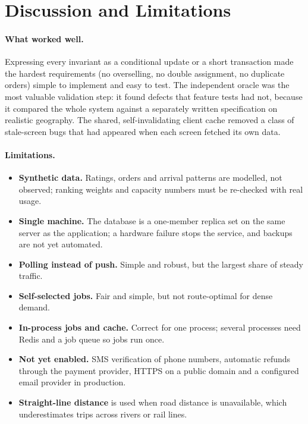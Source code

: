 \documentclass[manuscript,screen,review]{acmart}
\begin{document}
\section{Discussion and Limitations}
\label{sec:discussion}

\paragraph{What worked well.} Expressing every invariant as a conditional update or a short transaction made the hardest requirements (no overselling, no double assignment, no duplicate orders) simple to implement and easy to test. The independent oracle was the most valuable validation step: it found defects that feature tests had not, because it compared the whole system against a separately written specification on realistic geography. The shared, self-invalidating client cache removed a class of stale-screen bugs that had appeared when each screen fetched its own data.

\paragraph{Limitations.}
\begin{itemize}
  \item \textbf{Synthetic data.} Ratings, orders and arrival patterns are modelled, not observed; ranking weights and capacity numbers must be re-checked with real usage.
  \item \textbf{Single machine.} The database is a one-member replica set on the same server as the application; a hardware failure stops the service, and backups are not yet automated.
  \item \textbf{Polling instead of push.} Simple and robust, but the largest share of steady traffic.
  \item \textbf{Self-selected jobs.} Fair and simple, but not route-optimal for dense demand.
  \item \textbf{In-process jobs and cache.} Correct for one process; several processes need Redis and a job queue so jobs run once.
  \item \textbf{Not yet enabled.} SMS verification of phone numbers, automatic refunds through the payment provider, HTTPS on a public domain and a configured email provider in production.
  \item \textbf{Straight-line distance} is used when road distance is unavailable, which underestimates trips across rivers or rail lines.
\end{itemize}
\end{document}
